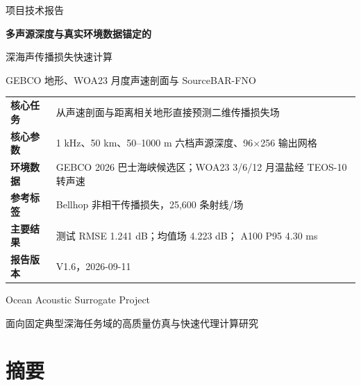 \documentclass[UTF8,11pt]{ctexart}
\newcommand{\BestRMSE}{1.241}
\newcommand{\GlobalBaseline}{4.223}
\newcommand{\GpuPninetyfive}{4.30}
\begin{document}
\begin{titlepage}
\vspace*{2.0cm}
{\sffamily\color{Blue}\Large 项目技术报告}\par
\vspace{0.75cm}
{\sffamily\bfseries\color{Navy}\fontsize{26}{34}\selectfont
多声源深度与真实环境数据锚定的\par
深海声传播损失快速计算}\par
\vspace{0.65cm}
{\sffamily\color{Dark}\Large
GEBCO 地形、WOA23 月度声速剖面与 SourceBAR-FNO}\par

\vspace{1.45cm}
\begin{summarybox}
\centering
\begin{tabular}{L{3.4cm}L{8.0cm}}
\textbf{核心任务} & 从声速剖面与距离相关地形直接预测二维传播损失场 \\
\textbf{核心参数} & 1 kHz、50 km、50--1000 m 六档声源深度、96$\times$256 输出网格 \\
\textbf{环境数据} & GEBCO 2026 巴士海峡候选区；WOA23 3/6/12 月温盐经 TEOS-10 转声速 \\
\textbf{参考标签} & Bellhop 非相干传播损失，25,600 条射线/场 \\
\textbf{主要结果} & 测试 RMSE \BestRMSE{} dB；均值场 \GlobalBaseline{} dB；
  A100 P95 \GpuPninetyfive{} ms \\
\textbf{报告版本} & V1.6，2026-09-11 \\
\end{tabular}
\end{summarybox}
\vfill
{\sffamily\color{Navy}\Large Ocean Acoustic Surrogate Project}\par
\vspace{0.3cm}
{\color{Dark}面向固定典型深海任务域的高质量仿真与快速代理计算研究}\par
\vspace{1.0cm}
\end{titlepage}

\section*{摘\quad 要}
\end{document}
